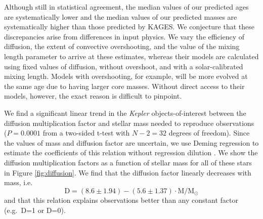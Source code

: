 \documentclass[manuscript,linenumbers]{aastex6}
\begin{document}
Although still in statistical agreement, the median values of our predicted ages are systematically lower and the median values of our predicted masses are systematically higher than those predicted by KAGES. We conjecture that these discrepancies arise from differences in input physics. We vary the efficiency of diffusion, the extent of convective overshooting, and the value of the mixing length parameter to arrive at these estimates, whereas their models are calculated using fixed values of diffusion, without overshoot, and with a solar-calibrated mixing length. Models with overshooting, for example, will be more evolved at the same age due to having larger core masses. Without direct access to their models, however, the exact reason is difficult to pinpoint. 

We find a significant linear trend in the \emph{Kepler} objects-of-interest between the diffusion multiplication factor and stellar mass needed to reproduce observations ($P = 0.0001$ from a two-sided t-test with $N-2=32$ degrees of freedom). Since the values of mass and diffusion factor are uncertain, we use Deming regression to estimate the coefficients of this relation without regression dilution \citep{deming1943statistical}. We show the diffusion multiplication factors as a function of stellar mass for all of these stars in Figure \ref{fig:diffusion}. We find that the diffusion factor linearly decreases with mass, i.e.\ 
\begin{equation} \label{eq:diffusion}
    \text{D} = ( 8.6 \pm 1.94 ) - ( 5.6 \pm 1.37 ) \cdot \text{M}/\text{M}_\odot
\end{equation}
and that this relation explains observations better than any constant factor (e.g.\ D=1 or D=0). 
\end{document}
